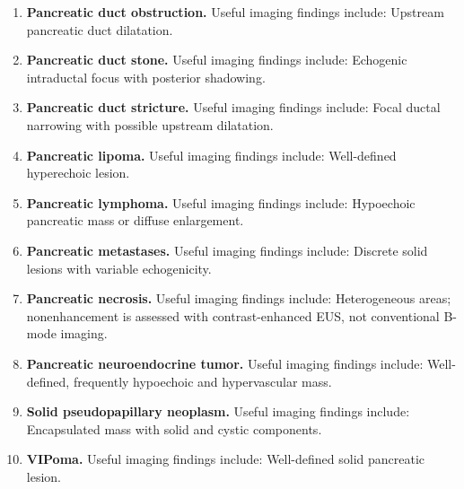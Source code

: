 \begin{enumerate}[leftmargin=*,itemsep=0.45em,topsep=0.4em]
\item \textbf{Pancreatic duct obstruction.} Useful imaging findings include: Upstream pancreatic duct dilatation.
\item \textbf{Pancreatic duct stone.} Useful imaging findings include: Echogenic intraductal focus with posterior shadowing.
\item \textbf{Pancreatic duct stricture.} Useful imaging findings include: Focal ductal narrowing with possible upstream dilatation.
\item \textbf{Pancreatic lipoma.} Useful imaging findings include: Well-defined hyperechoic lesion.
\item \textbf{Pancreatic lymphoma.} Useful imaging findings include: Hypoechoic pancreatic mass or diffuse enlargement.
\item \textbf{Pancreatic metastases.} Useful imaging findings include: Discrete solid lesions with variable echogenicity.
\item \textbf{Pancreatic necrosis.} Useful imaging findings include: Heterogeneous areas; nonenhancement is assessed with contrast-enhanced EUS, not conventional B-mode imaging.
\item \textbf{Pancreatic neuroendocrine tumor.} Useful imaging findings include: Well-defined, frequently hypoechoic and hypervascular mass.
\item \textbf{Solid pseudopapillary neoplasm.} Useful imaging findings include: Encapsulated mass with solid and cystic components.
\item \textbf{VIPoma.} Useful imaging findings include: Well-defined solid pancreatic lesion.
\end{enumerate}


